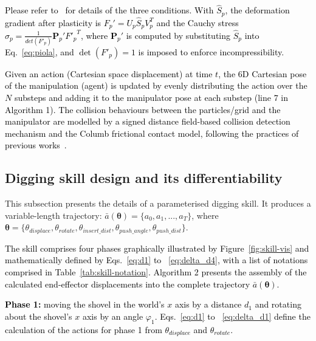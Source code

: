 \documentclass[letterpaper, 10 pt, journal, twoside]{ieeetran}
\newcommand{\rp}[1]{\textcolor{black}{#1}}
\begin{document}
\rp{Please refer to~\cite{klar2016drucker} for details of the three conditions. With $\hat{S}_p$, the deformation gradient after plasticity is $F_p' = U_p \hat{S}_p V^{T}_p$ and the Cauchy stress $\sigma_p = \frac{1}{det(F'_p)}\bm{P}_p'{F'_p}^T$, where $\bm{P}_p'$ is computed by substituting $\hat{S}_p$ into Eq.~\ref{eq:piola}, and $\det(F'_p) = 1$ is imposed to enforce incompressibility.}

\rp{Given an action (Cartesian space displacement) at time $t$, the 6D Cartesian pose of the manipulation (agent) is updated by evenly distributing the action over the $N$ substeps and adding it to the manipulator pose at each substep (line 7 in Algorithm 1). The collision behaviours between the particles/grid and the manipulator are modelled by a signed distance field-based collision detection mechanism and the Columb frictional contact model, following the practices of previous works~\cite{hu2018moving,xy2024sysid}.}

\subsection{Digging skill design and its differentiability}\label{subsec:skill}
This subsection presents the details of a parameterised digging skill. It produces a variable-length trajectory: $\bar{a}(\pmb{\theta})=\{a_0, a_1,...,a_T\}$, 
where $\pmb{\theta} = \{\theta_{displace}, \theta_{rotate}, \theta_{insert\_dist}, \theta_{push\_angle}, \theta_{push\_dist}\}$. 

\rp{The skill comprises four phases graphically illustrated by Figure~\ref{fig:skill-vis} and mathematically defined by Eqs.~\ref{eq:d1} to ~\ref{eq:delta_d4}, with a list of notations comprised in Table~\ref{tab:skill-notation}. Algorithm 2 presents the assembly of the calculated end-effector displacements into the complete trajectory $\bar{a}(\pmb{\theta})$.}

\rp{\textbf{Phase 1:} moving the shovel in the world's $x$ axis by a distance $d_1$ and rotating about the shovel's $x$ axis by an angle $\varphi_1$. Eqs.~\ref{eq:d1} to ~\ref{eq:delta_d1} define the calculation of the actions for phase 1 from $\theta_{displace}$ and $\theta_{rotate}$.}
\end{document}
